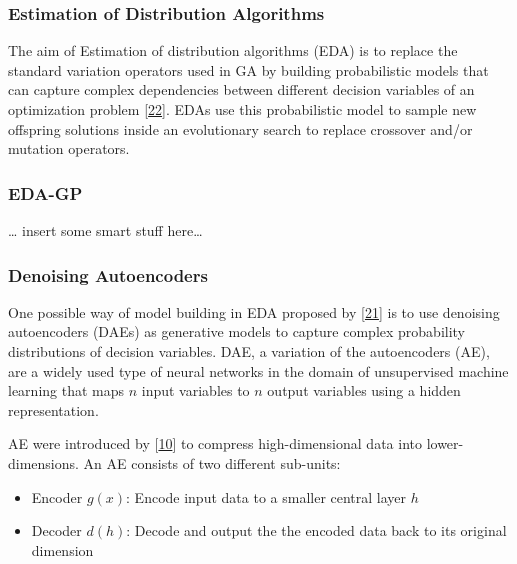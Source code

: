 \documentclass[
  11pt,
]{article}
\providecommand{\tightlist}{%
  \setlength{\itemsep}{0pt}\setlength{\parskip}{0pt}}
\begin{document}
\hypertarget{estimation-of-distribution-algorithms}{%
\subsubsection{Estimation of Distribution Algorithms}\label{estimation-of-distribution-algorithms}}

The aim of Estimation of distribution algorithms (EDA) is to replace the standard variation operators used in GA by building probabilistic models that can capture complex dependencies between different decision variables of an optimization problem {[}\protect\hyperlink{ref-design_of_modern_heuristics}{22}{]}.
EDAs use this probabilistic model to sample new offspring solutions inside an evolutionary search to replace crossover and/or mutation operators.

\hypertarget{eda-gp}{%
\subsubsection{EDA-GP}\label{eda-gp}}

\ldots{} insert some smart stuff here\ldots{}

\hypertarget{denoising-autoencoders}{%
\subsubsection{Denoising Autoencoders}\label{denoising-autoencoders}}

One possible way of model building in EDA proposed by {[}\protect\hyperlink{ref-harmless_overfitting_eda}{21}{]} is to use denoising autoencoders (DAEs) as generative models to capture complex probability distributions of decision variables.
DAE, a variation of the autoencoders (AE), are a widely used type of neural networks in the domain of unsupervised machine learning that maps \(n\) input variables to \(n\) output variables using a hidden representation.

AE were introduced by {[}\protect\hyperlink{ref-ae_orig}{10}{]} to compress high-dimensional data into lower-dimensions. An AE consists of two different sub-units:

\begin{itemize}
\tightlist
\item
  Encoder \(g(x)\): Encode input data to a smaller central layer \(h\)
\item
  Decoder \(d(h)\): Decode and output the the encoded data back to its original dimension
\end{itemize}
\end{document}
